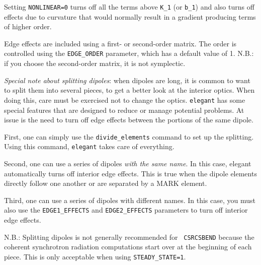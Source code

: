 Setting {\tt NONLINEAR=0} turns off all the terms above {\tt K\_1} (or {\tt b\_1}) and
also turns off effects due to curvature that would
normally result in a gradient producing terms of higher order.

Edge effects are included using a first- or second-order matrix.  The
order is controlled using the {\tt EDGE\_ORDER} parameter, which has a
default value of 1.  N.B.: if you choose the second-order matrix, it
is not symplectic.

{\em Special note about splitting dipoles}: when dipoles are long, it is
common to want to split them into several pieces, to get a better look
at the interior optics.  When doing this, care must be exercised not
to change the optics.  {\tt elegant} has some special features that
are designed to reduce or manage potential problems. At issue is the
need to turn off edge effects between the portions of the same dipole.

First, one can simply use the \verb|divide_elements| command to set up
the splitting.  Using this command, {\tt elegant} takes care of everything.

Second, one can use a series of dipoles {\em with the same name}.  In this case,
elegant automatically turns off interior edge effects.  This is true when the
dipole elements directly follow one another or are separated by a MARK element.

Third, one can use a series of dipoles with different names.  In this case, you
must also use the \verb|EDGE1_EFFECTS| and \verb|EDGE2_EFFECTS| parameters to
turn off interior edge effects.  

N.B.: Splitting dipoles is not generally recommended for {\tt
CSRCSBEND} because the coherent synchrotron radiation computations
start over at the beginning of each piece.  This is only acceptable
when using \verb|STEADY_STATE=1|.
